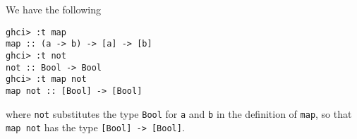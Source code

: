 
We have the following
\begin{verbatim}
ghci> :t map
map :: (a -> b) -> [a] -> [b]
ghci> :t not
not :: Bool -> Bool
ghci> :t map not
map not :: [Bool] -> [Bool]
\end{verbatim}
where \verb|not| substitutes the type \verb|Bool| for \verb|a| and \verb|b| in the 
definition of \verb|map|, so that \verb|map not| has the type \verb|[Bool] -> [Bool]|.
